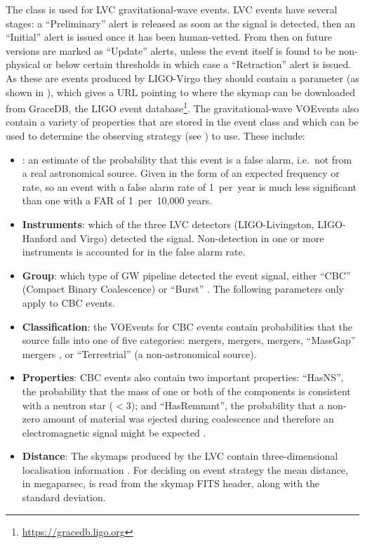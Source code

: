 \begin{colsection}
The  class is used for LVC gravitational-wave events. LVC events have several stages: a ``Preliminary'' alert is released as soon as the signal is detected, then an ``Initial'' alert is issued once it has been human-vetted. From then on future versions are marked as ``Update'' alerts, unless the event itself is found to be non-physical or below certain thresholds in which case a ``Retraction'' alert is issued. As these are events produced by LIGO-Virgo they should contain a  parameter (as shown in ), which gives a URL pointing to where the skymap can be downloaded from GraceDB, the LIGO event database\footnote{\url{https://gracedb.ligo.org}}. The gravitational-wave VOEvents also contain a variety of properties that are stored in the event class and which can be used to determine the observing strategy (see ) to use. These include:
\begin{itemize}
    \item \textbf{}: an estimate of the probability that this event is a false alarm, i.e.\ not from a real astronomical source. Given in the form of an expected frequency or rate, so an event with a false alarm rate of 1~per~year is much less significant than one with a FAR of 1~per~10,000 years.
    \item \textbf{Instruments}: which of the three LVC detectors (LIGO-Livingston, LIGO-Hanford and Virgo) detected the signal. Non-detection in one or more instruments is accounted for in the false alarm rate.
    \item \textbf{Group}: which type of GW pipeline detected the event signal, either ``CBC'' (Compact Binary Coalescence) or ``Burst'' \citep[other, unmodelled detections, see][]{GW_burst}. The following parameters only apply to CBC events.
    \item \textbf{Classification}: the VOEvents for CBC events contain probabilities that the source falls into one of five categories:  mergers,  mergers,  mergers, ``MassGap'' mergers \citep[one or other of the components is in the hypothetical ``mass gap'' between neutron stars and black holes, defined as 3--\SI{5}{\solarmass};][]{GW_MassGap}, or ``Terrestrial'' (a non-astronomical source).
    \item \textbf{Properties}: CBC events also contain two important properties: ``HasNS'', the probability that the mass of one or both of the components is consistent with a neutron star ($<$\SI{3}{\solarmass}); and ``HasRemnant'', the probability that a non-zero amount of material was ejected during coalescence and therefore an electromagnetic signal might be expected \citep{LVC_userguide}.
    \item \textbf{Distance}: The skymaps produced by the LVC contain three-dimensional localisation information \citep{GW_distance}. For deciding on event strategy the mean distance, in megaparsec, is read from the skymap FITS header, along with the standard deviation.
\end{itemize}


\end{colsection}
